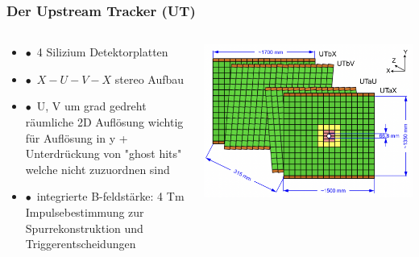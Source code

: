 \documentclass[aspectratio=1610, 12pt, xcolor=dvipsnames]{beamer}
\begin{document}
\begin{frame}\frametitle{Der Upstream Tracker (UT)}
  \begin{columns}
    \begin{column}[c]{0.48\textwidth}
      \begin{itemize}
        \item $\bullet$\, 4 Silizium Detektorplatten
        \item $\bullet$\, $X-U-V-X$ stereo Aufbau
        \item $\bullet$\, U, V um  grad gedreht \to räumliche 2D Auflösung wichtig für Auflösung in y + Unterdrückung von "ghost hits" welche nicht zuzuordnen sind
        \item $\bullet$\, integrierte B-feldstärke: 4 Tm \to Impulsebestimmung zur Spurrekonstruktion und Triggerentscheidungen
      \end{itemize}
    \end{column}
    \begin{column}[c]{0.48\textwidth}
      \includegraphics[width=\textwidth]{plots/UT.png}
    \end{column}
  \end{columns}
\end{frame}
\end{document}

